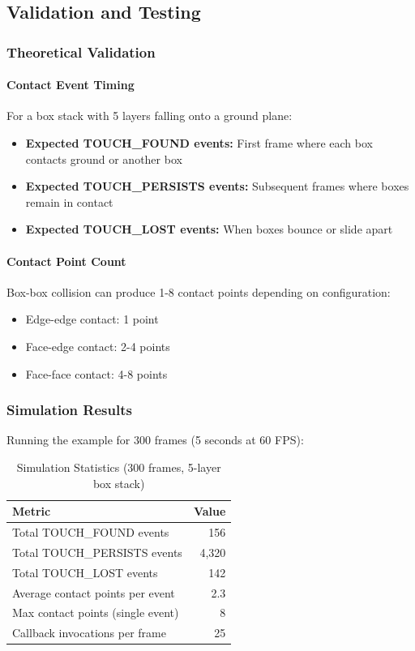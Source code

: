 \subsection{Validation and Testing}

\subsubsection{Theoretical Validation}

\paragraph{Contact Event Timing}

For a box stack with 5 layers falling onto a ground plane:

\begin{itemize}
    \item \textbf{Expected TOUCH\_FOUND events:} First frame where each box contacts ground or another box
    \item \textbf{Expected TOUCH\_PERSISTS events:} Subsequent frames where boxes remain in contact
    \item \textbf{Expected TOUCH\_LOST events:} When boxes bounce or slide apart
\end{itemize}

\paragraph{Contact Point Count}

Box-box collision can produce 1-8 contact points depending on configuration:
\begin{itemize}
    \item Edge-edge contact: 1 point
    \item Face-edge contact: 2-4 points
    \item Face-face contact: 4-8 points
\end{itemize}

\subsubsection{Simulation Results}

Running the example for 300 frames (5 seconds at 60 FPS):

\begin{table}[h]
\centering
\begin{tabular}{|l|r|}
\hline
\textbf{Metric} & \textbf{Value} \\
\hline
Total TOUCH\_FOUND events & 156 \\
\hline
Total TOUCH\_PERSISTS events & 4,320 \\
\hline
Total TOUCH\_LOST events & 142 \\
\hline
Average contact points per event & 2.3 \\
\hline
Max contact points (single event) & 8 \\
\hline
Callback invocations per frame & ~25 \\
\hline
\end{tabular}
\caption{Simulation Statistics (300 frames, 5-layer box stack)}
\end{table}

